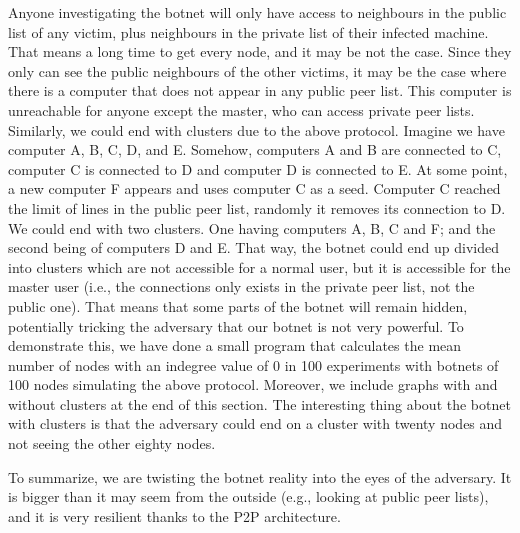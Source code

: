 \documentclass[11pt, a4paper,twoside]{tesi_upf}
\begin{document}
Anyone investigating the botnet will only have access to neighbours in the public list of any victim, plus neighbours in the private list of their infected machine. That means a long time to get every node, and it may be not the case. Since they only can see the public neighbours of the other victims, it may be the case where there is a computer that does not appear in any public peer list. This computer is unreachable for anyone except the master, who can access private peer lists. Similarly, we could end with clusters due to the above protocol. Imagine we have computer A, B, C, D, and E. Somehow, computers A and B are connected to C, computer C is connected to D and computer D is connected to E. At some point, a new computer F appears and uses computer C as a seed. Computer C reached the limit of lines in the public peer list, randomly it removes its connection to D. We could end with two clusters. One having computers A, B, C and F; and the second being of computers D and E. That way, the botnet could end up divided into clusters which are not accessible for a normal user, but it is accessible for the master user (i.e., the connections only exists in the private peer list, not the public one). That means that some parts of the botnet will remain hidden, potentially tricking the adversary that our botnet is not very powerful. To demonstrate this, we have done a small program that calculates the mean number of nodes with an indegree value of 0 in 100 experiments with botnets of 100 nodes simulating the above protocol. Moreover, we include graphs with and without clusters at the end of this section. The interesting thing about the botnet with clusters is that the adversary could end on a cluster with twenty nodes and not seeing the other eighty nodes.

To summarize, we are twisting the botnet reality into the eyes of the adversary. It is bigger than it may seem from the outside (e.g., looking at public peer lists), and it is very resilient thanks to the P2P architecture.
\end{document}
